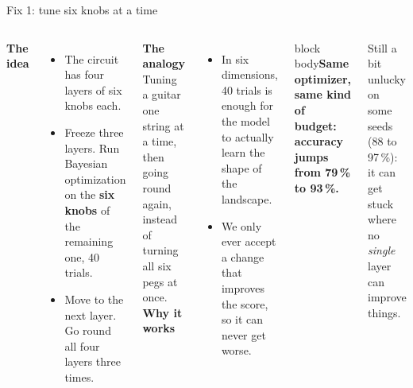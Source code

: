 \documentclass[aspectratio=169,11pt]{beamer}
\newcommand{\takeaway}[1]{\begin{beamercolorbox}[rounded=true,sep=6pt,wd=\textwidth]{block body}\textbf{#1}\end{beamercolorbox}}
\begin{document}
\begin{frame}{Fix 1: tune six knobs at a time}
  \small
  \begin{columns}[T]
      \textbf{The idea}
      \begin{itemize}
        \item The circuit has four layers of six knobs each.
        \item Freeze three layers. Run Bayesian optimization on the \textbf{six knobs} of the remaining one, 40 trials.
        \item Move to the next layer. Go round all four layers three times.
      \end{itemize}
      \vspace{0.5em}
      \textbf{The analogy}\\
      Tuning a guitar one string at a time, then going round again, instead of turning all six pegs at once.
      \textbf{Why it works}
      \begin{itemize}
        \item In six dimensions, 40 trials is enough for the model to actually learn the shape of the landscape.
        \item We only ever accept a change that improves the score, so it can never get worse.
      \end{itemize}
      \vspace{0.5em}
      \takeaway{Same optimizer, same kind of budget: accuracy jumps from 79\,\% to 93\,\%.}
      \vspace{0.2em}
      Still a bit unlucky on some seeds (88 to 97\,\%): it can get stuck where no \emph{single} layer can improve things.
  \end{columns}
\end{frame}
\end{document}
